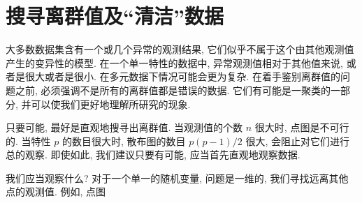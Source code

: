 \section{搜寻离群值及“清洁”数据}
\label{sec:4.7}

大多数数据集含有一个或几个异常的观测结果, 它们似乎不属于这个由其他观测值产生的变异性的模型. 在一个单一特性的数据中, 异常观测值相对于其他值来说, 或者是很大或者是很小. 在多元数据下情况可能会更为复杂. 在着手鉴别离群值的问题之前, 必须强调不是所有的离群值都是错误的数据. 它们有可能是一聚类的一部分, 并可以使我们更好地理解所研究的现象.

只要可能, 最好是直观地搜寻出离群值. 当观测值的个数 $n$ 很大时, 点图是不可行的. 当特性 $p$ 的数目很大时, 散布图的数目 $p(p-1)/2$ 很大, 会阻止对它们进行总的观察. 即使如此, 我们建议只要有可能, 应当首先直观地观察数据.

我们应当观察什么? 对于一个单一的随机变量, 问题是一维的, 我们寻找远离其他点的观测值. 例如, 点图
